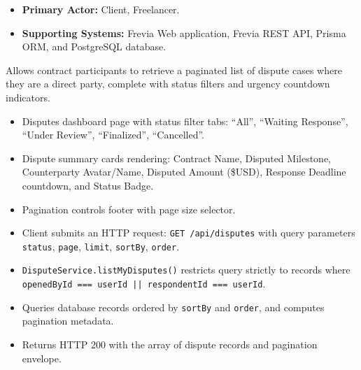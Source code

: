 
\begin{itemize}[leftmargin=1.6em,topsep=3pt,itemsep=2pt,parsep=0pt,label=$\bullet$]
      \item \textbf{Primary Actor:} Client, Freelancer.
      \item \textbf{Supporting Systems:} Frevia Web application, Frevia REST API, Prisma ORM, and PostgreSQL database.
\end{itemize}

\noindent Allows contract participants to retrieve a paginated list of dispute cases where they are a direct party, complete with status filters and urgency countdown indicators.

\begin{itemize}[leftmargin=1.6em,topsep=3pt,itemsep=2pt,parsep=0pt,label=$\bullet$]
      \item Disputes dashboard page with status filter tabs: ``All'', ``Waiting Response'', ``Under Review'', ``Finalized'', ``Cancelled''.
      \item Dispute summary cards rendering: Contract Name, Disputed Milestone, Counterparty Avatar/Name, Disputed Amount (\$USD), Response Deadline countdown, and Status Badge.
      \item Pagination controls footer with page size selector.
\end{itemize}

\begin{itemize}[leftmargin=1.6em,topsep=3pt,itemsep=2pt,parsep=0pt,label=$\bullet$]
      \item Client submits an HTTP request: \texttt{GET /\allowbreak{}api/\allowbreak{}disputes} with query parameters \texttt{status}, \texttt{page}, \texttt{limit}, \texttt{sortBy}, \texttt{order}.
      \item \texttt{DisputeService.listMyDisputes()} restricts query strictly to records where \texttt{openedById === userId || respondentId === userId}.
      \item Queries database records ordered by \texttt{sortBy} and \texttt{order}, and computes pagination metadata.
      \item Returns HTTP 200 with the array of dispute records and pagination envelope.
\end{itemize}

